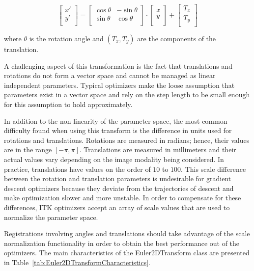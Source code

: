 \begin{equation}
\left[ 
\begin{array}{c}
x' \\
y' \\
\end{array}
\right]
=
\left[ 
\begin{array}{cc}
\cos{\theta} & -\sin{\theta} \\
\sin{\theta} &  \cos{\theta} \\
\end{array}
\right]
\cdot
\left[ 
\begin{array}{c}
x  \\
y  \\
\end{array}
\right]
+ 
\left[ 
\begin{array}{c}
T_x  \\
T_y  \\
\end{array}
\right]
\end{equation}

where $\theta$ is the rotation angle and $(T_x,T_y)$ are the components of the
translation.

A challenging aspect of this transformation is the fact that translations and
rotations do not form a vector space and cannot be managed as linear
independent parameters. Typical optimizers make the loose assumption that
parameters exist in a vector space and rely on the step length to be small
enough for this assumption to hold approximately.

In addition to the non-linearity of the parameter space, the most common
difficulty found when using this transform is the difference in units used
for rotations and translations. Rotations are measured in radians; hence,
their values are in the range $[-\pi,\pi]$. Translations are measured in
millimeters and their actual values vary depending on the image modality
being considered. In practice, translations have values on the order of $10$
to $100$. This scale difference between the rotation and translation
parameters is undesirable for gradient descent optimizers because they
deviate from the trajectories of descent and make optimization slower and more
unstable. In order to compensate for these differences, ITK optimizers accept
an array of scale values that are used to normalize the parameter space.

Registrations involving angles and translations should take advantage of the
scale normalization functionality in order to obtain the best performance out
of the optimizers. The main characteristics of the Euler2DTransform class
are presented in Table~\ref{tab:Euler2DTransformCharacteristics}.


